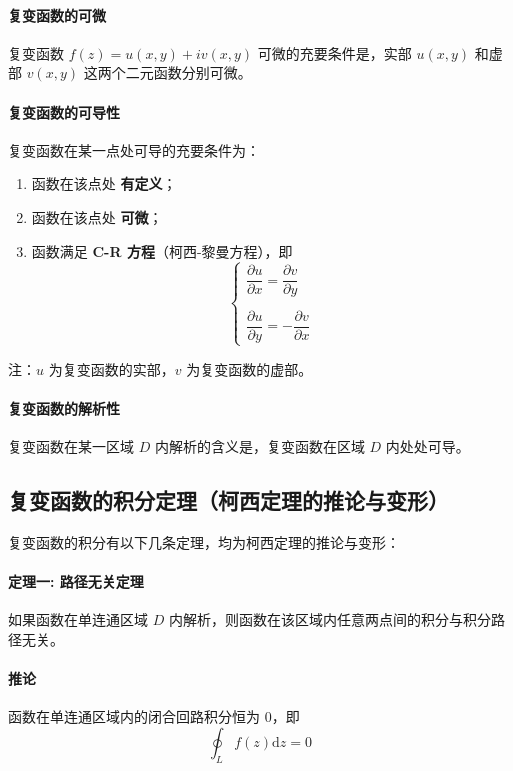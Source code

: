 \documentclass{article}
\begin{document}
	\paragraph{复变函数的可微}
	复变函数 $f(z)=u(x,y)+iv(x,y)$ 可微的充要条件是，实部 $u(x,y)$ 和虚部 $v(x,y)$ 这两个二元函数分别可微。
	
	\paragraph{复变函数的可导性}
	复变函数在某一点处可导的充要条件为：
	\begin{enumerate}[label=\arabic*., leftmargin=2em]
		\item 函数在该点处 \textbf{有定义}；
		\item 函数在该点处 \textbf{可微}；
		\item 函数满足 \textbf{C-R 方程}（柯西-黎曼方程），即
		\[
		\begin{cases}
			\dfrac{\partial u}{\partial x}=\dfrac{\partial v}{\partial y} \\
			\\
			\dfrac{\partial u}{\partial y}=-\dfrac{\partial v}{\partial x}
		\end{cases}
		\]
	\end{enumerate}
	注：$u$ 为复变函数的实部，$v$ 为复变函数的虚部。
	
	\paragraph{复变函数的解析性}
	复变函数在某一区域 $D$ 内解析的含义是，复变函数在区域 $D$ 内处处可导。
	
	\subsection{复变函数的积分定理（柯西定理的推论与变形）}
	复变函数的积分有以下几条定理，均为柯西定理的推论与变形：
	
	\paragraph{定理一: 路径无关定理}
	如果函数在单连通区域 $D$ 内解析，则函数在该区域内任意两点间的积分与积分路径无关。
	
	\paragraph{推论}
	函数在单连通区域内的闭合回路积分恒为 0，即
	\[
	\oint_{L}f(z)\mathrm{d}z = 0
	\]
	
\end{document}
